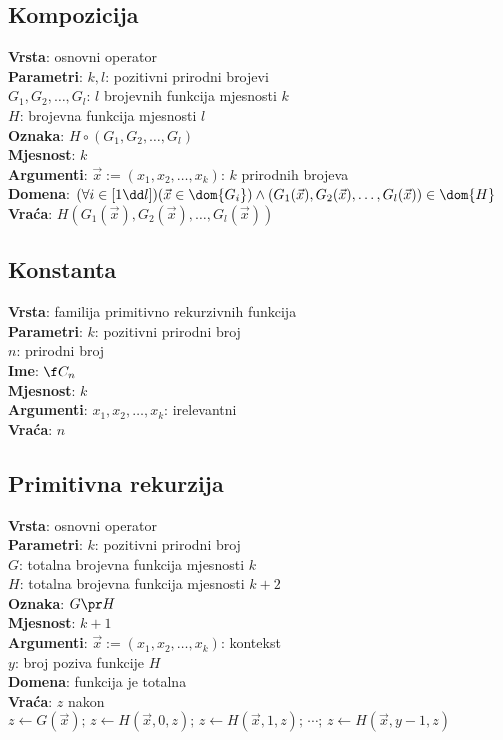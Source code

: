\subsection{Kompozicija}
\textbf{Vrsta}: osnovni operator\\
\textbf{Parametri}: $k,l$: pozitivni prirodni brojevi\\
$G_1,G_2,\dots,G_l$: $l$ brojevnih funkcija mjesnosti $k$\\
$H$: brojevna funkcija mjesnosti $l$\\
\textbf{Oznaka}: $H\circ(G_1,G_2,\dots,G_l)$\\
\textbf{Mjesnost}: $k$\\
\textbf{Argumenti}: $\vec x:=(x_1,x_2,\dots,x_k)$: $k$ prirodnih brojeva\\
\textbf{Domena}: $(\forall i\in[1\dd l])(\vec x\in\dom{G_i})\land(G_1(\vec x),G_2(\vec x),\dots,G_l(\vec x))\in\dom{H}$\\
\textbf{Vraća}: $H(G_1(\vec x),G_2(\vec x),\dots,G_l(\vec x))$

\subsection{Konstanta}
\textbf{Vrsta}: familija primitivno rekurzivnih funkcija\\
\textbf{Parametri}: $k$: pozitivni prirodni broj\\
$n$: prirodni broj\\
\textbf{Ime}: $\f C_n$\\
\textbf{Mjesnost}: $k$\\
\textbf{Argumenti}: $x_1,x_2,\dots,x_k$: irelevantni\\
\textbf{Vraća}: $n$

\subsection{Primitivna rekurzija}
\textbf{Vrsta}: osnovni operator\\
\textbf{Parametri}: $k$: pozitivni prirodni broj\\
$G$: totalna brojevna funkcija mjesnosti $k$\\
$H$: totalna brojevna funkcija mjesnosti $k+2$\\
\textbf{Oznaka}: $G\pr H$\\
\textbf{Mjesnost}: $k+1$\\
\textbf{Argumenti}: $\vec x:=(x_1,x_2,\dots,x_k)$: kontekst\\
$y$: broj poziva funkcije $H$\\
\textbf{Domena}: funkcija je totalna\\
\textbf{Vraća}: $z$ nakon $z\leftarrow G(\vec x);\,z\leftarrow H(\vec x,0,z);\,z\leftarrow H(\vec x,1,z);\,\dotsm;\,z\leftarrow H(\vec x,y-1,z)$

